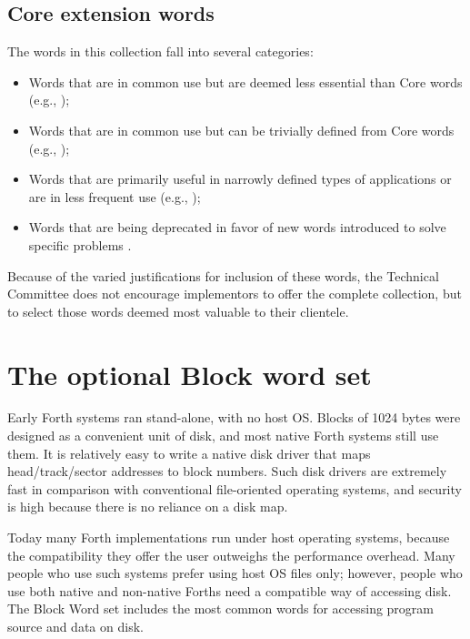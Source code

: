 
\setcounter{subsection}{1}
\subsection{Core extension words} %
\label{rat:core-ext}

The words in this collection fall into several categories:

\begin{itemize}
\item Words that are in common use but are deemed less essential than
	Core words (e.g., );

\item Words that are in common use but can be trivially defined from
	Core words (e.g., );

\item Words that are primarily useful in narrowly defined types of
	applications or are in less frequent use (e.g., );

\item Words that are being deprecated in favor of new words introduced
	to solve specific problems .
\end{itemize}

Because of the varied justifications for inclusion of these words,
the Technical Committee does not encourage implementors to offer the
complete collection, but to select those words deemed most valuable to
their clientele.



\section{The optional Block word set} %
\label{rat:block}

Early Forth systems ran stand-alone, with no host OS. Blocks of 1024
bytes were designed as a convenient unit of disk, and most native
Forth systems still use them. It is relatively easy to write a native
disk driver that maps head/track/sector addresses to block numbers.
Such disk drivers are extremely fast in comparison with conventional
file-oriented operating systems, and security is high because there is
no reliance on a disk map.

Today many Forth implementations run under host operating systems,
because the compatibility they offer the user outweighs the performance
overhead. Many people who use such systems prefer using host OS files
only; however, people who use both native and non-native Forths need a
compatible way of accessing disk. The Block Word set includes the most
common words for accessing program source and data on disk.

